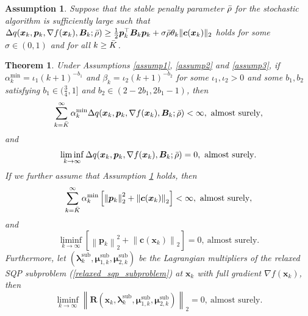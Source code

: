 \documentclass[aos]{imsart}
\numberwithin{equation}{section}
\theoremstyle{plain}
\newtheorem{assumption}{Assumption}
\newtheorem{theorem}{Theorem}
\begin{document}
\begin{assumption}
\label{assump8}
    Suppose that the stable penalty parameter $\Bar{\rho}$ for the stochastic algorithm is sufficiently large such that 
    $\Delta q(\bm{x}_k,\bm{p}_k,\nabla f(\bm{x}_k),\bm{B}_k;\Bar{\rho}) \geq \frac{1}{2} \bm{p}_k^{\top} \bm{B}_k \bm{p}_k + \sigma \Bar{\rho} \theta_k \|\bm{c}(\bm{x}_k)\|_2$ holds for some $\sigma \in (0,1)$ and for all $k \geq \Bar{K}$. 
    
\end{assumption}


\begin{theorem}
\label{theorem_lim_inf}
    Under Assumptions \ref{assump1}, \ref{assump2} and \ref{assump3}, if $\alpha_k^{\text{min}} = \iota_1 (k+1)^{-b_1}$ and $\beta_k = \iota_2 (k+1)^{-b_2}$ for some $\iota_1, \iota_2 >0$ and some $b_1, b_2$ satisfying $b_1 \in (\frac{3}{4},1]$ and $b_2 \in \left( 2-2b_1,2b_1-1\right)$, then  
    \begin{equation*}
        \sum_{k=\Bar{K}}^{\infty}  \alpha_k^{\text{min}} \Delta q(\bm{x}_k,\bm{p}_k,\nabla f(\bm{x}_k),\bm{B}_k;\Bar{\rho}) < \infty,~\text{almost surely},
    \end{equation*}
    and
    \begin{equation*}
        \mathop{\lim \inf}_{k \to \infty} \Delta q(\bm{x}_k,\bm{p}_k,\nabla f(\bm{x}_k),\bm{B}_k;\Bar{\rho}) = 0,~\text{almost surely}.
    \end{equation*}
    If we further assume that Assumption \ref{assump8} holds, then
    \begin{equation*}
        \sum_{k=\Bar{K}}^{\infty}  \alpha_k^{\text{min}}\left[\left\|\bm{p}_k\right\|_2^2 + \left\|\bm{c}(\bm{x}_k) \right\|_2 \right] < \infty,~\text{almost surely},
    \end{equation*}
    and
    \begin{equation*}
        \mathop{\lim \inf}_{k \to \infty} \left[\left\|\bm{p}_k\right\|_2^2 + \left\|\bm{c}(\bm{x}_k) \right\|_2 \right] = 0,~\text{almost surely}.
    \end{equation*}
    Furthermore, let $(\bm{\lambda}_k^{\text{sub}}, \bm{\mu}_{1,k}^{\text{sub}},\bm{\mu}_{2,k}^{\text{sub}})$ be the Lagrangian multipliers of the relaxed SQP subproblem (\ref{relaxed_sqp_subproblem}) at $\bm{x}_k$ with full gradient $\nabla f(\bm{x}_k)$, then 
    \begin{equation}
        \mathop{\lim \inf}_{k \to \infty} \left\| \bm{R}(\bm{x}_k, \bm{\lambda}_k^{\text{sub}}, \bm{\mu}_{1,k}^{\text{sub}}, \bm{\mu}_{2,k}^{\text{sub}}) \right\|_2 = 0,~\text{almost surely}.
    \end{equation}
\end{theorem}
\end{document}
